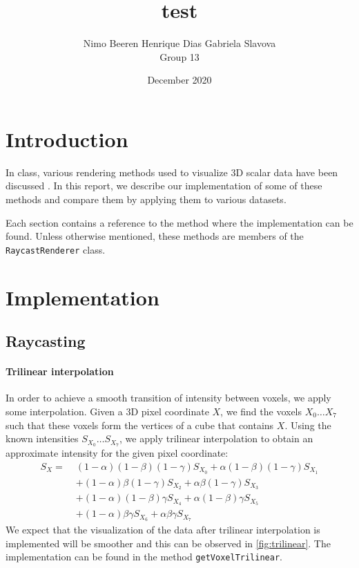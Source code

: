 \documentclass[a4paper]{article}
\title{test}
\author{Nimo Beeren \quad Henrique Dias \quad Gabriela Slavova\\Group 13}
\date{December 2020}
\begin{document}
\maketitle

\section{Introduction}

In class, various rendering methods used to visualize 3D scalar data have been discussed \citep{2imv20_2}. In this report, we describe our implementation of some of these methods and compare them by applying them to various datasets.

Each section contains a reference to the method where the implementation can be found. Unless otherwise mentioned, these methods are members of the {\tt RaycastRenderer} class.

\section{Implementation}

\subsection{Raycasting}
\label{subsec:raycasting}

\paragraph{Trilinear interpolation}

In order to achieve a smooth transition of intensity between voxels, we apply some interpolation. Given a 3D pixel coordinate $X$, we find the voxels $X_0 \ldots X_7$ such that these voxels form the vertices of a cube that contains $X$. Using the known intensities $S_{X_0}\ldots S_{X_7}$, we apply trilinear interpolation to obtain an approximate intensity for the given pixel coordinate:
\begin{align*}
  S_X =\;&(1 - \alpha) (1 - \beta) (1 - \gamma) S_{X_0}
    + \alpha (1 - \beta) (1 - \gamma) S_{X_1}\\
    &+ (1 - \alpha) \beta (1 - \gamma) S_{X_2}
    + \alpha \beta (1 - \gamma) S_{X_3}\\
    &+ (1 - \alpha) (1 - \beta) \gamma S_{X_4}
    + \alpha (1 - \beta) \gamma S_{X_5}\\
    &+ (1 - \alpha) \beta \gamma S_{X_6}
    + \alpha \beta \gamma S_{X_7}
\end{align*}
We expect that the visualization of the data after trilinear interpolation is implemented will be smoother and this can be observed in \autoref{fig:trilinear}. The implementation can be found in the method {\tt getVoxelTrilinear}.
\end{document}
